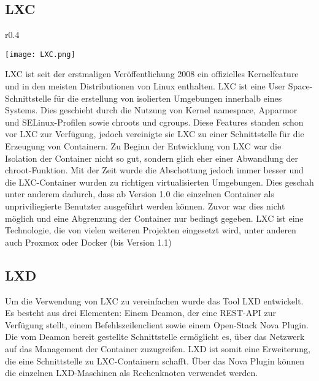 \subsection*{\ac{LXC}}
\label{sec:LXC}
\begin{wrapfigure}{r}{0.4\textwidth}
	\vspace{-40pt}
	\begin{center}
		\texttt{[image: LXC.png]}
	\end{center}
	\vspace{-15pt}
	\caption[Logo \ac{LXC}]{ \footnotemark}
	\label{fig:LXC}
	\vspace{-30pt}
\end{wrapfigure}
\ac{LXC} ist seit der erstmaligen Veröffentlichung 2008 ein offizielles Kernelfeature und in den meisten Distributionen von Linux enthalten. \ac{LXC} ist eine User Space-Schnittstelle für die erstellung von isolierten Umgebungen innerhalb eines Systems. Dies geschieht durch die Nutzung von Kernel namespace, Apparmor und SELinux-Profilen sowie chroots und cgroups. Diese Features standen schon vor \ac{LXC} zur Verfügung, jedoch vereinigte sie \ac{LXC} zu einer Schnittstelle für die Erzeugung von Containern. Zu Beginn der Entwicklung von \ac{LXC} war die Isolation der Container nicht so gut, sondern glich eher einer Abwandlung der chroot-Funktion. Mit der Zeit wurde die Abschottung jedoch immer besser und die \ac{LXC}-Container wurden zu richtigen virtualisierten Umgebungen. Dies geschah unter anderem dadurch, dass ab Version 1.0 die einzelnen Container als unpriviliegierte Benutzter ausgeführt werden können. Zuvor war dies nicht möglich und eine Abgrenzung der Container nur bedingt gegeben. \ac{LXC} ist eine Technologie, die von vielen weiteren Projekten eingesetzt wird, unter anderen auch Proxmox oder Docker (bis Version 1.1)\cite{IEEE7036275, IEEE7185212, IEEE7571957,IEEE7929714,LXCHomepage}


\subsection*{LXD}
\label{sec:lxd}

Um die Verwendung von \ac{LXC} zu vereinfachen wurde das Tool LXD entwickelt. Es besteht aus drei Elementen: Einem Deamon, der eine REST-API zur Verfügung stellt, einem Befehlszeilenclient sowie einem Open-Stack Nova Plugin. Die vom Deamon bereit gestellte Schnittstelle ermöglicht es, über das Netzwerk auf das Management der Container zuzugreifen. LXD ist somit eine Erweiterung, die eine Schnittstelle zu \ac{LXC}-Containern schafft. Über das Nova Plugin können die einzelnen LXD-Maschinen als Rechenknoten verwendet werden. \cite{LXDHomepage}

